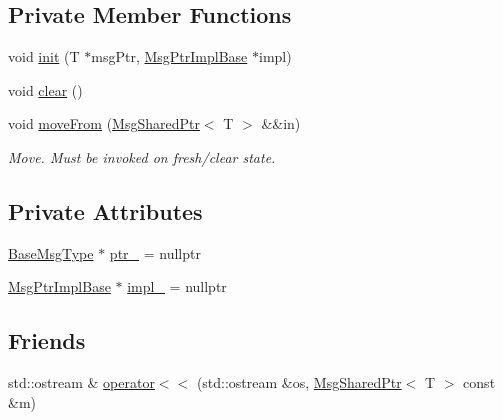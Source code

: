 \subsection*{Private Member Functions}
\begin{DoxyCompactItemize}
\item 
void \hyperlink{structvt_1_1messaging_1_1_msg_shared_ptr_a7117c1a8364c3267d4694b79a2f5cc6b}{init} (T $\ast$msg\+Ptr, \hyperlink{structvt_1_1messaging_1_1_msg_ptr_impl_base}{Msg\+Ptr\+Impl\+Base} $\ast$impl)
\item 
void \hyperlink{structvt_1_1messaging_1_1_msg_shared_ptr_ace4439c8585f3d3c50b861570db07d99}{clear} ()
\item 
void \hyperlink{structvt_1_1messaging_1_1_msg_shared_ptr_a351f61999bc2f15ec3027fcb76c9a942}{move\+From} (\hyperlink{structvt_1_1messaging_1_1_msg_shared_ptr}{Msg\+Shared\+Ptr}$<$ T $>$ \&\&in)
\begin{DoxyCompactList}\small\item\em Move. Must be invoked on fresh/clear state. \end{DoxyCompactList}\end{DoxyCompactItemize}
\subsection*{Private Attributes}
\begin{DoxyCompactItemize}
\item 
\hyperlink{structvt_1_1messaging_1_1_msg_shared_ptr_a778cb9ec8919e4a309d28ed345ac318d}{Base\+Msg\+Type} $\ast$ \hyperlink{structvt_1_1messaging_1_1_msg_shared_ptr_aac5218a8b39004946a523ac4a729a3da}{ptr\+\_\+} = nullptr
\item 
\hyperlink{structvt_1_1messaging_1_1_msg_ptr_impl_base}{Msg\+Ptr\+Impl\+Base} $\ast$ \hyperlink{structvt_1_1messaging_1_1_msg_shared_ptr_aa0cf96203c13d77d691888c852bc333e}{impl\+\_\+} = nullptr
\end{DoxyCompactItemize}
\subsection*{Friends}
\begin{DoxyCompactItemize}
\item 
std\+::ostream \& \hyperlink{structvt_1_1messaging_1_1_msg_shared_ptr_ac412f09ec806f5915ea4a94f3e84d5f4}{operator$<$$<$} (std\+::ostream \&os, \hyperlink{structvt_1_1messaging_1_1_msg_shared_ptr}{Msg\+Shared\+Ptr}$<$ T $>$ const \&m)
\end{DoxyCompactItemize}


